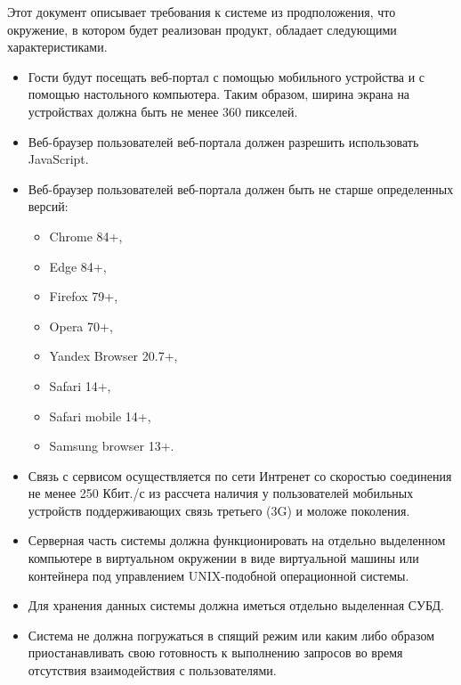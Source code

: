 Этот документ описывает требования к системе из продположения, что окружение, в котором будет реализован продукт, обладает следующими характеристиками.
\begin{itemize}
    \item Гости будут посещать веб-портал с помощью мобильного устройства и с помощью настольного компьютера. Таким образом, ширина экрана на устройствах должна быть не менее 360 пикселей.
    \item Веб-браузер пользователей веб-портала должен разрешить использовать JavaScript.
    \item Веб-браузер пользователей веб-портала должен быть не старше определенных версий:\begin{itemize}
        \item Chrome 84+,
        \item Edge 84+,
        \item Firefox 79+,
        \item Opera 70+,
        \item Yandex Browser 20.7+,
        \item Safari 14+,
        \item Safari mobile 14+,
        \item Samsung browser 13+.
    \end{itemize} 
    \item Связь с сервисом осуществляется по сети Интренет со скоростью соединения не менее 250 Кбит./с из рассчета наличия у пользователей мобильных устройств поддерживающих связь третьего (3G) и моложе поколения.
    \item Серверная часть системы должна функционировать на отдельно выделенном компьютере в виртуальном окружении в виде виртуальной машины или контейнера под управлением UNIX-подобной операционной системы.
    \item Для хранения данных системы должна иметься отдельно выделенная СУБД.
    \item Система не должна погружаться в спящий режим или каким либо образом приостанавливать свою готовность к выполнению запросов во время отсутствия взаимодействия с пользователями.
\end{itemize}


%
%
%
